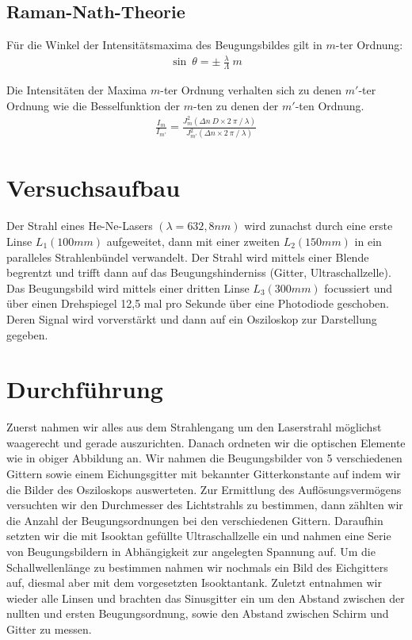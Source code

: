 \documentclass[12pt]{article}
\begin{document}
\subsection{Raman-Nath-Theorie}
Für die Winkel der Intensitätsmaxima des Beugungsbildes gilt in $m$-ter Ordnung:
\begin{align}
 \sin~\theta = \pm~\frac{\lambda}{\Lambda}~m
\end{align}

Die Intensitäten der Maxima $m$-ter Ordnung verhalten sich zu denen $m'$-ter Ordnung wie die Besselfunktion der $m$-ten zu denen der $m'$-ten Ordnung.
\begin{align}
 \frac{I_m}{I_{m'}} = \frac{J^2_m(\Delta n~D \times 2~\pi~/~\lambda)}{J^2_{m'}(\Delta n \times 2~\pi~/~\lambda)}
\end{align}

\newpage

\section{Versuchsaufbau}
Der Strahl eines He-Ne-Lasers $(\lambda = 632,8nm)$ wird zunachst durch eine erste Linse $L_1(100mm)$ 
aufgeweitet, dann mit einer zweiten $L_2(150mm)$ in ein paralleles Strahlenbündel verwandelt. Der Strahl
 wird mittels einer Blende begrentzt und trifft dann auf das Beugungshinderniss (Gitter, Ultraschallzelle). 
Das Beugungsbild wird mittels einer dritten Linse $L_3(300mm)$ focussiert und über einen Drehspiegel 12,5 mal
 pro Sekunde über eine Photodiode geschoben. Deren Signal wird vorverstärkt und dann auf ein Osziloskop zur
 Darstellung gegeben.

\section{Durchführung}
Zuerst nahmen wir alles aus dem Strahlengang um den Laserstrahl möglichst waagerecht und gerade auszurichten. Danach ordneten wir die optischen Elemente wie in obiger Abbildung an. Wir nahmen die Beugungsbilder von 5 verschiedenen Gittern sowie einem Eichungsgitter mit bekannter Gitterkonstante auf indem wir die Bilder des Osziloskops auswerteten. Zur Ermittlung des Auflösungsvermögens versuchten wir den Durchmesser des Lichtstrahls zu bestimmen, dann zählten wir die Anzahl der Beugungsordnungen bei den verschiedenen Gittern. Daraufhin setzten wir die mit Isooktan gefüllte Ultraschallzelle ein und nahmen eine Serie von Beugungsbildern in Abhängigkeit zur angelegten Spannung auf. Um die Schallwellenlänge zu bestimmen nahmen wir nochmals ein Bild des Eichgitters auf, diesmal aber mit dem vorgesetzten Isooktantank.  Zuletzt entnahmen wir wieder alle Linsen und brachten das Sinusgitter ein um den
Abstand zwischen der nullten und ersten Beugungsordnung, sowie den Abstand zwischen Schirm und Gitter zu messen.
\end{document}
